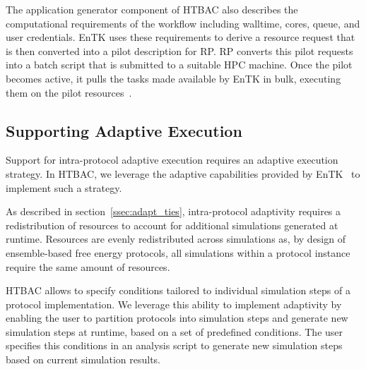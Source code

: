 The application generator component of HTBAC also describes the computational
requirements of the workflow including walltime, cores, queue, and user
credentials. EnTK uses these requirements to derive a resource request that
is then converted into a pilot description for RP. RP converts this pilot
requests into a batch script that is submitted to a suitable HPC machine.
Once the pilot becomes active, it pulls the tasks made available by EnTK in
bulk, executing them on the pilot resources~\cite{merzky2015radical}.


\subsection{Supporting Adaptive Execution}

Support for intra-protocol adaptive execution requires an adaptive execution
strategy. In HTBAC, we leverage the adaptive capabilities provided by
EnTK~\cite{adaptivebiomolecular} to implement such a strategy. 

As described in section~\ref{ssec:adapt_ties}, intra-protocol adaptivity
requires a redistribution of resources to account for additional simulations
generated at runtime. Resources are evenly redistributed across simulations
as, by design of ensemble-based free energy protocols, all simulations within
a protocol instance require the same amount of resources.


HTBAC allows to specify conditions tailored to individual simulation steps of
a protocol implementation. We leverage this ability to implement adaptivity
by enabling the user to partition protocols into simulation steps and
generate new simulation steps at runtime, based on a set of predefined
conditions. The user specifies this conditions in an analysis script to
generate new simulation steps based on current simulation results.

